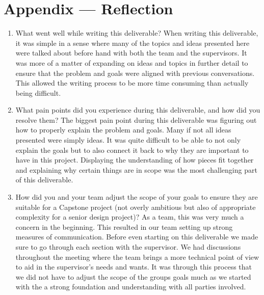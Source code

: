 \documentclass{article}
\begin{document}
\newpage{}

\section*{Appendix --- Reflection}

\begin{enumerate}
    \item What went well while writing this deliverable? \newline \newline
        When writing this deliverable, it was simple in a sense where many of
        the topics and ideas presented here were talked about before hand with
        both the team and the supervisors. It was more of a matter of expanding
        on ideas and topics in further detail to ensure that the problem and
        goals were aligned with previous conversations. This allowed the writing
        process to be more time consuming than actually being difficult. 
    \item What pain points did you experience during this deliverable, and how
    did you resolve them? \newline \newline
        The biggest pain point during this deliverable was figuring out how to
        properly explain the problem and goals. Many if not all ideas presented
        were simply ideas. It was quite difficult to be able to not only explain
        the goals but to also connect it back to why they are important to have
        in this project. Displaying the understanding of how pieces fit together
        and explaining why certain things are in scope was the most challenging
        part of this deliverable. 
    \item How did you and your team adjust the scope of your goals to ensure
    they are suitable for a Capstone project (not overly ambitious but also of
    appropriate complexity for a senior design project)? \newline \newline
        As a team, this was very much a concern in the beginning. This resulted
        in our team setting up strong measures of communication. Before even
        starting on this deliverable we made sure to go through each section
        with the supervisor. We had discussions throughout the meeting where the
        team brings a more technical point of view to aid in the supervisor's
        needs and wants. It was through this process that we did not have to
        adjust the scope of the groups goals much as we started with the a
        strong foundation and understanding with all parties involved.  
\end{enumerate}  
\end{document}

